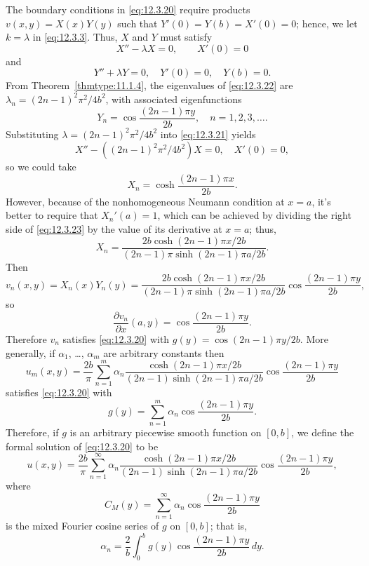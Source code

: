 \begin{examplesolution}
\solution The boundary conditions in \eqref{eq:12.3.20} require products $v(x,y)=X(x)Y(y)$ such that
$Y'(0)=Y(b)=X'(0)=0$; hence, we let $k=\lambda$ in \eqref{eq:12.3.3}. Thus, $X$ and $Y$ must satisfy
\begin{equation}
  \label{eq:12.3.21}X''-\lambda X=0,\quad\quad X'(0)=0
\end{equation}
and
\begin{equation}
  \label{eq:12.3.22}Y''+\lambda Y=0,\quad Y'(0)=0,\quad Y(b)=0.
\end{equation}
From Theorem~\ref{thmtype:11.1.4}, the eigenvalues of \eqref{eq:12.3.22} are
$\lambda_{n}=(2n-1)^{2}\pi^{2}/4b^{2}$, with associated eigenfunctions
\[
  Y_{n}=\cos\frac{(2n-1)\pi y}{2b},\quad n=1,2,3,\dots.
\]
Substituting $\lambda=(2n-1)^{2}\pi^{2}/4b^{2}$ into \eqref{eq:12.3.21} yields
\[
  X''-((2n-1)^{2}\pi^{2}/4b^{2})X=0,\quad X'(0)=0,
\]
so we could take
\begin{equation}
  \label{eq:12.3.23}X_{n}=\cosh\frac{(2n-1)\pi x}{2b}.
\end{equation}
However, because of the nonhomogeneous Neumann condition at $x=a$, it's better to require that
$X_{n}'(a)=1$, which can be achieved by dividing the right side of \eqref{eq:12.3.23} by the value
of its derivative at $x=a$; thus,
\[
  X_{n}= \frac{2b\cosh(2n-1)\pi x/2b}{(2n-1)\pi\sinh(2n-1)\pi a/2b}.
\]
Then
\[
  v_{n}(x,y)=X_{n}(x)Y_{n}(y)= \frac{2b\cosh(2n-1)\pi x/2b}{(2n-1)\pi\sinh(2n-1)\pi a/2b}\cos\frac{(2n-1)\pi y}{2b},
\]
so
\[
  \frac{\partial v_{n}}{\partial x}(a,y)=\cos\frac{(2n-1)\pi y}{2b}.
\]
Therefore $v_{n}$ satisfies \eqref{eq:12.3.20} with $g(y)=\cos(2n-1)\pi y/2b$. More generally, if
$\alpha_{1}$, \dots, $\alpha_{m}$ are arbitrary constants then
\[
  u_{m}(x,y)=\frac{2b}{\pi}\sum_{n=1}^{m}\alpha_{n}\frac{\cosh(2n-1)\pi x/2b}{(2n-1)\sinh(2n-1)\pi a/2b}\cos\frac{(2n-1)\pi y}{2b}
\]
satisfies \eqref{eq:12.3.20} with
\[
  g(y)=\sum_{n=1}^{m}\alpha_{n}\cos\frac{(2n-1)\pi y}{2b}.
\]
Therefore, if $g$ is an arbitrary piecewise smooth function on $[0,b]$, we define the formal
solution of \eqref{eq:12.3.20} to be
\[
  u(x,y)=\frac{2b}{\pi}\sum_{n=1}^{\infty}\alpha_{n}\frac{\cosh(2n-1)\pi x/2b}{(2n-1)\sinh(2n-1)\pi a/2b}\cos\frac{(2n-1)\pi y}{2b},
\]
where
\[
  C_{M}(y)=\sum_{n=1}^{\infty}\alpha_{n}\cos\frac{(2n-1)\pi y}{2b}
\]
is the mixed Fourier cosine series of $g$ on $[0,b]$; that is,
\[
  \alpha_{n}=\frac{2}{b}\int_{0}^{b}g(y)\cos\frac{(2n-1)\pi y}{2b}\,dy.
\]
\end{examplesolution}

